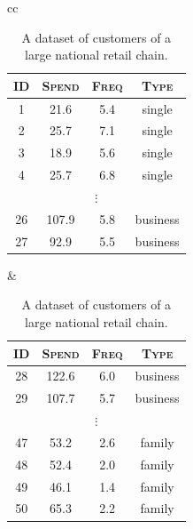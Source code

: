 \documentclass[xcolor={table}]{beamer}
\newcommand{\featN}[1]{\textsc{#1}}
\begin{document}
 \begin{frame} 
\begin{table}[htb]
\caption{A dataset of customers of a large national retail chain.}
\label{tab:customerTypeDataset}
\centering
\begin{tiny}
\begin{tabular}{cc}
		\hline
			\begin{minipage}{0.4\textwidth}
					\begin{tabular}[ht]{ c c c c }
		\featN{ID} & \featN{Spend} & \featN{Freq} &  \featN{Type} \\
		\hline
1	&	21.6	&	5.4	&	single	\\
2	&	25.7	&	7.1	&	single	\\
3	&	18.9	&	5.6	&	single	\\
4	&	25.7	&	6.8	&	single	\\
\multicolumn{4}{c}{$\vdots$}\\
26	&	107.9	&	5.8	&	business	\\
27	&	92.9	&	5.5	&	business	\\

		\hline
					\end{tabular}
			\end{minipage}
			&
			\begin{minipage}{0.4\textwidth}
					\begin{tabular}[ht]{ c c c c }
		\featN{ID} & \featN{Spend} & \featN{Freq} &  \featN{Type} \\
		\hline
28	&	122.6	&	6.0	&	business	\\
29	&	107.7	&	5.7	&	business	\\
\multicolumn{4}{c}{$\vdots$}\\
47	&	53.2	&	2.6	&	family	\\
48	&	52.4	&	2.0	&	family	\\
49	&	46.1	&	1.4	&	family	\\
50	&	65.3	&	2.2	&	family	\\
\hline
				\end{tabular}
			\end{minipage}
\end{tabular}
\end{tiny}
\end{table}
\end{frame} 
\end{document}
